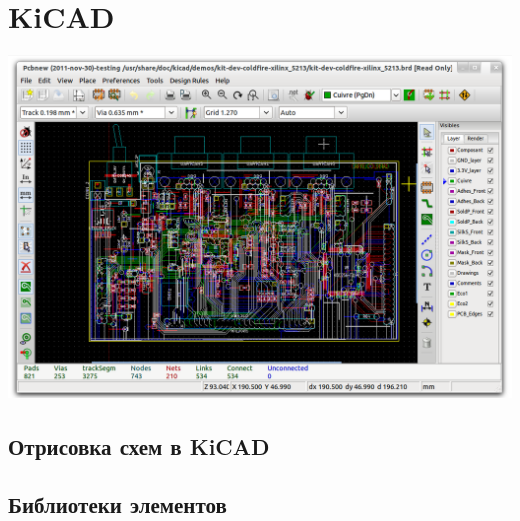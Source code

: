 \chapter{KiCAD}

\noindent\includegraphics[height=0.5\textheight]{kicad/kicad_pcbnew.png}



\section{Отрисовка схем в KiCAD}

\section{Библиотеки элементов}




% 
% 
% 
% 
% 
% 
% 
% 
% 
% 
% 
% 
% 
% 
% 
